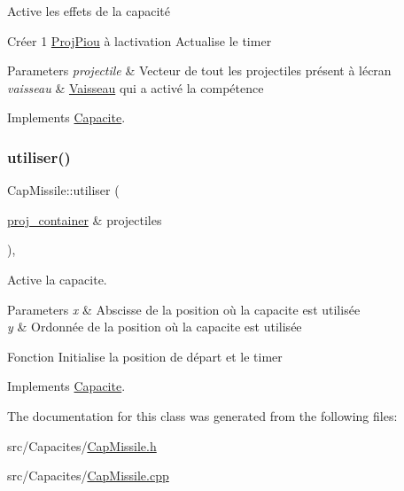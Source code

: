 Active les effets de la capacité 

Créer 1 \mbox{\hyperlink{class_proj_piou}{Proj\+Piou}} à l\textquotesingle{}activation Actualise le timer 
\begin{DoxyParams}{Parameters}
{\em projectile} & Vecteur de tout les projectiles présent à l\textquotesingle{}écran \\
\hline
{\em vaisseau} & \mbox{\hyperlink{class_vaisseau}{Vaisseau}} qui a activé la compétence \\
\hline
\end{DoxyParams}


Implements \mbox{\hyperlink{class_capacite_a85355aeb1d4acc049ed97da177acbd5f}{Capacite}}.

\mbox{\label{class_cap_missile_a8972a92894ca15903563ec41bc63c6ef}} 
\subsubsection{\texorpdfstring{utiliser()}{utiliser()}}
{\footnotesize\ttfamily Cap\+Missile\+::utiliser (\begin{DoxyParamCaption}\item[{\mbox{\hyperlink{def__type_8h_a87980cd8ee9533e561a73e8bbc728188}{proj\+\_\+container}} \&}]{projectiles }\end{DoxyParamCaption})\hspace{0.3cm}{\ttfamily [override]}, {\ttfamily [virtual]}}



Active la capacite. 


\begin{DoxyParams}{Parameters}
{\em x} & Abscisse de la position où la capacite est utilisée \\
\hline
{\em y} & Ordonnée de la position où la capacite est utilisée\\
\hline
\end{DoxyParams}
Fonction Initialise la position de départ et le timer 

Implements \mbox{\hyperlink{class_capacite_abac1434e2ac3ecc9e5afdafd9a7a4bed}{Capacite}}.



The documentation for this class was generated from the following files\+:\begin{DoxyCompactItemize}
\item 
src/\+Capacites/\mbox{\hyperlink{_cap_missile_8h}{Cap\+Missile.\+h}}\item 
src/\+Capacites/\mbox{\hyperlink{_cap_missile_8cpp}{Cap\+Missile.\+cpp}}\end{DoxyCompactItemize}
